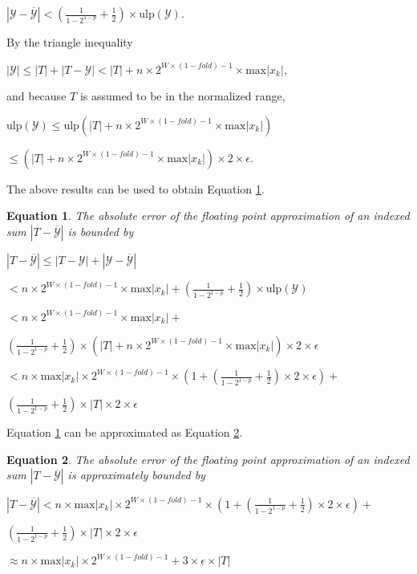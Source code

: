 \documentclass[12pt]{article}
\providecommand{\max}{\ensuremath{\text{max}}}
\providecommand{\ulp}{\ensuremath{\text{ulp}}}
\theoremstyle{plain}
\newtheorem{eq}{Equation}[section]
\begin{document}
    $|\mathcal{Y} - \overline{\mathcal{Y}}| < (\frac{1}{1 - 2^{1 - p}} + \frac{1}{2})\times \ulp(\mathcal{Y})$.

    By the triangle inequality

    $|\mathcal{Y}| \leq |T| + |T - \mathcal{Y}| < |T| + n \times 2^{W \times (1 - fold) - 1} \times \max|x_k|$,

    and because $T$ is assumed to be in the normalized range,

    $\ulp(\mathcal{Y}) \leq \ulp(|T| + n \times 2^{W \times (1 - fold) - 1} \times \max|x_k|)$

    \indent \indent$\leq (|T| + n \times 2^{W \times (1 - fold) - 1} \times \max|x_k|) \times 2 \times \epsilon$.

    The above results can be used to obtain Equation \ref{eq:error}.

    \begin{eq} The absolute error of the floating point approximation of an indexed sum $|T - \overline{\mathcal{Y}}|$ is bounded by

      $|T - \overline{\mathcal{Y}}| \leq |T - \mathcal{Y}| + |\mathcal{Y} - \overline{\mathcal{Y}}|$

      \indent\indent$< n \times 2^{W \times (1 - fold) - 1} \times \max|x_k| + (\frac{1}{1 - 2^{1 - p}} + \frac{1}{2})\times \ulp(\mathcal{Y})$

      \indent\indent$< n \times 2^{W \times (1 - fold) - 1} \times \max|x_k| + $

      \indent\indent \indent$(\frac{1}{1 - 2^{1 - p}} + \frac{1}{2})\times(|T| + n \times 2^{W \times (1 - fold) - 1} \times \max|x_k|) \times 2 \times \epsilon$

      \indent\indent$< n \times \max|x_k|\times 2^{W \times (1 - fold) - 1} \times(1 + (\frac{1}{1 - 2^{1 - p}} + \frac{1}{2}) \times 2 \times \epsilon) + $

      \indent\indent \indent$(\frac{1}{1 - 2^{1 - p}} + \frac{1}{2})\times |T| \times 2 \times \epsilon$
      \label{eq:error}
    \end{eq}

    Equation \ref{eq:error} can be approximated as Equation \ref{eq:errorapprox}.

    \begin{eq} The absolute error of the floating point approximation of an indexed sum $|T - \overline{\mathcal{Y}}|$ is approximately bounded by

      $|T - \overline{\mathcal{Y}}| < n \times \max|x_k|\times 2^{W \times (1 - fold) - 1} \times(1 + (\frac{1}{1 - 2^{1 - p}} + \frac{1}{2}) \times 2 \times \epsilon) + $

      \indent \indent$(\frac{1}{1 - 2^{1 - p}} + \frac{1}{2})\times |T| \times 2 \times \epsilon$

      \indent\indent$\approx n \times \max|x_k|\times 2^{W \times (1 - fold) - 1} + 3 \times \epsilon \times |T|$
      \label{eq:errorapprox}
    \end{eq}
\end{document}
